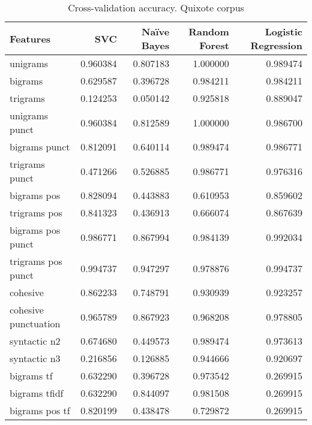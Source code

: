 \documentclass{article}
\begin{document}
\begin{table}
\centering
\caption{Cross-validation accuracy. Quixote corpus}
\begin{tabular}{lrrrr}
\toprule
{Features} &       SVC &  Naïve Bayes &  Random Forest &  Logistic Regression \\
\midrule
unigrams                   &  0.960384 &     0.807183 &       1.000000 &             0.989474 \\
bigrams                    &  0.629587 &     0.396728 &       0.984211 &             0.984211 \\
trigrams                   &  0.124253 &     0.050142 &       0.925818 &             0.889047 \\
unigrams punct             &  0.960384 &     0.812589 &       1.000000 &             0.986700 \\
bigrams punct              &  0.812091 &     0.640114 &       0.989474 &             0.986771 \\
trigrams punct             &  0.471266 &     0.526885 &       0.986771 &             0.976316 \\
bigrams pos                &  0.828094 &     0.443883 &       0.610953 &             0.859602 \\
trigrams pos               &  0.841323 &     0.436913 &       0.666074 &             0.867639 \\
bigrams pos punct          &  0.986771 &     0.867994 &       0.984139 &             0.992034 \\
trigrams pos punct         &  0.994737 &     0.947297 &       0.978876 &             0.994737 \\
cohesive                   &  0.862233 &     0.748791 &       0.930939 &             0.923257 \\
cohesive punctuation       &  0.965789 &     0.867923 &       0.968208 &             0.978805 \\
syntactic n2               &  0.674680 &     0.449573 &       0.989474 &             0.973613 \\
syntactic n3               &  0.216856 &     0.126885 &       0.944666 &             0.920697 \\
bigrams tf                 &  0.632290 &     0.396728 &       0.973542 &             0.269915 \\
bigrams tfidf              &  0.632290 &     0.844097 &       0.981508 &             0.269915 \\
bigrams pos tf             &  0.820199 &     0.438478 &       0.729872 &             0.269915 \\

\end{tabular}
\end{table}
\end{document}
